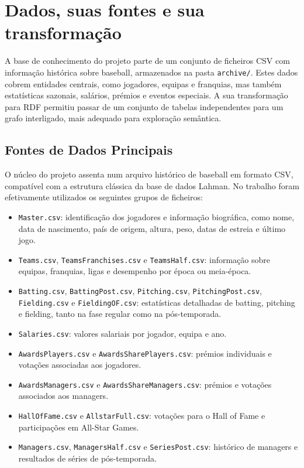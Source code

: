 \chapter{Dados, suas fontes e sua transforma\c{c}\~ao}

A base de conhecimento do projeto parte de um conjunto de ficheiros CSV com informa\c{c}\~ao hist\'orica sobre baseball, armazenados na pasta \texttt{archive/}. Estes dados cobrem entidades centrais, como jogadores, equipas e franquias, mas tamb\'em estat\'isticas sazonais, sal\'arios, pr\'emios e eventos especiais. A sua transforma\c{c}\~ao para RDF permitiu passar de um conjunto de tabelas independentes para um grafo interligado, mais adequado para explora\c{c}\~ao sem\^antica.

\section{Fontes de Dados Principais}

O n\'ucleo do projeto assenta num arquivo hist\'orico de baseball em formato CSV, compat\'ivel com a estrutura cl\'assica da base de dados Lahman. No trabalho foram efetivamente utilizados os seguintes grupos de ficheiros:

\begin{itemize}[leftmargin=*]
  \item \texttt{Master.csv}: identifica\c{c}\~ao dos jogadores e informa\c{c}\~ao biogr\'afica, como nome, data de nascimento, pa\'is de origem, altura, peso, datas de estreia e \'{u}ltimo jogo.
  \item \texttt{Teams.csv}, \texttt{TeamsFranchises.csv} e \texttt{TeamsHalf.csv}: informa\c{c}\~ao sobre equipas, franquias, ligas e desempenho por \'{e}poca ou meia-\'{e}poca.
  \item \texttt{Batting.csv}, \texttt{BattingPost.csv}, \texttt{Pitching.csv}, \texttt{PitchingPost.csv}, \texttt{Fielding.csv} e \texttt{FieldingOF.csv}: estat\'isticas detalhadas de batting, pitching e fielding, tanto na fase regular como na p\'os-temporada.
  \item \texttt{Salaries.csv}: valores salariais por jogador, equipa e ano.
  \item \texttt{AwardsPlayers.csv} e \texttt{AwardsSharePlayers.csv}: pr\'emios individuais e vota\c{c}\~oes associadas aos jogadores.
  \item \texttt{AwardsManagers.csv} e \texttt{AwardsShareManagers.csv}: pr\'emios e vota\c{c}\~oes associados aos managers.
  \item \texttt{HallOfFame.csv} e \texttt{AllstarFull.csv}: vota\c{c}\~oes para o Hall of Fame e participa\c{c}\~oes em All-Star Games.
  \item \texttt{Managers.csv}, \texttt{ManagersHalf.csv} e \texttt{SeriesPost.csv}: hist\'orico de managers e resultados de s\'eries de p\'os-temporada.
\end{itemize}

